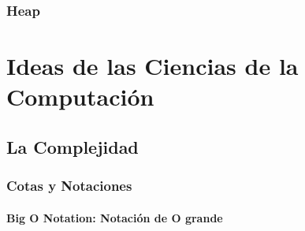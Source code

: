 \documentclass[12pt, fleqn]{report}                             %
\theoremstyle{break}                                            %
\begin{document}
        \clearpage
        \section{Heap}


\part{Ideas de las Ciencias de la Computación}
\label{part:IdeasDeCienciasDeLaComputacion}
    

    \clearpage
    \chapter{La Complejidad}

        \section{Cotas y Notaciones}

            \subsection{Big O Notation: Notación de O grande}



    \clearpage
\end{document}

